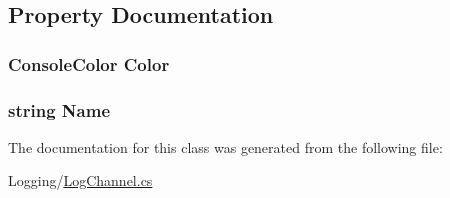 \subsection{Property Documentation}
\hypertarget{classOTA_1_1Logging_1_1LogChannel_ad2c93089db393e5335ef195d21fec9a7}{}
\subsubsection[{Color}]{\setlength{\rightskip}{0pt plus 5cm}Console\+Color Color\hspace{0.3cm}{\ttfamily [get]}}\label{classOTA_1_1Logging_1_1LogChannel_ad2c93089db393e5335ef195d21fec9a7}
\hypertarget{classOTA_1_1Logging_1_1LogChannel_a7ee9065718e6628dc7791b756fa6c0f9}{}
\subsubsection[{Name}]{\setlength{\rightskip}{0pt plus 5cm}string Name\hspace{0.3cm}{\ttfamily [get]}}\label{classOTA_1_1Logging_1_1LogChannel_a7ee9065718e6628dc7791b756fa6c0f9}


The documentation for this class was generated from the following file\+:\begin{DoxyCompactItemize}
\item 
Logging/\hyperlink{LogChannel_8cs}{Log\+Channel.\+cs}\end{DoxyCompactItemize}
